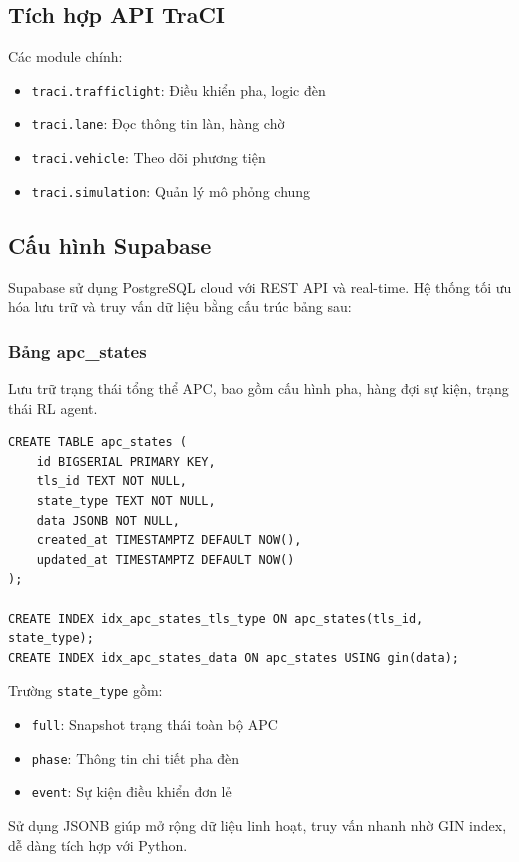 \subsection{Tích hợp API TraCI}

Các module chính:
\begin{itemize}
    \item \texttt{traci.trafficlight}: Điều khiển pha, logic đèn
    \item \texttt{traci.lane}: Đọc thông tin làn, hàng chờ
    \item \texttt{traci.vehicle}: Theo dõi phương tiện
    \item \texttt{traci.simulation}: Quản lý mô phỏng chung
\end{itemize}

\subsection{Cấu hình Supabase}

Supabase sử dụng PostgreSQL cloud với REST API và real-time. Hệ thống tối ưu hóa lưu trữ và truy vấn dữ liệu bằng cấu trúc bảng sau:

\subsubsection{Bảng apc\_states}

Lưu trữ trạng thái tổng thể APC, bao gồm cấu hình pha, hàng đợi sự kiện, trạng thái RL agent.

\begin{lstlisting}[style=sql,caption={Định nghĩa bảng apc\_states}]
CREATE TABLE apc_states (
    id BIGSERIAL PRIMARY KEY,
    tls_id TEXT NOT NULL,
    state_type TEXT NOT NULL,
    data JSONB NOT NULL,
    created_at TIMESTAMPTZ DEFAULT NOW(),
    updated_at TIMESTAMPTZ DEFAULT NOW()
);

CREATE INDEX idx_apc_states_tls_type ON apc_states(tls_id, state_type);
CREATE INDEX idx_apc_states_data ON apc_states USING gin(data);
\end{lstlisting}

Trường \texttt{state\_type} gồm:
\begin{itemize}
    \item \texttt{full}: Snapshot trạng thái toàn bộ APC
    \item \texttt{phase}: Thông tin chi tiết pha đèn
    \item \texttt{event}: Sự kiện điều khiển đơn lẻ
\end{itemize}
Sử dụng JSONB giúp mở rộng dữ liệu linh hoạt, truy vấn nhanh nhờ GIN index, dễ dàng tích hợp với Python.


